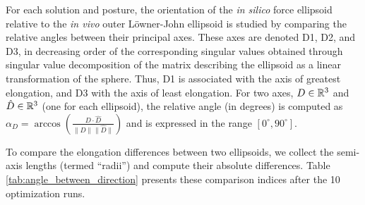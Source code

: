 For each solution and posture, the orientation of the \emph{in silico} force ellipsoid relative to the \emph{in vivo} outer Löwner-John ellipsoid is studied by comparing the relative angles between their principal axes. These axes are denoted D1, D2, and D3, in decreasing order of the corresponding singular values obtained through singular value decomposition of the matrix describing the ellipsoid as a linear transformation of the sphere. Thus, D1 is associated with the axis of greatest elongation, and D3 with the axis of least elongation. For two axes, $D\in\mathbb{R}^3$ and $\hat{D}\in\mathbb{R}^3$ (one for each ellipsoid), the relative angle (in degrees) is computed as $\alpha_D = \arccos\left(\frac{D \cdot \hat{D}}{\|D\|\|\hat{D}\|}\right)$ and is expressed in the range $[0^\circ, 90^\circ]$.

To compare the elongation differences between two ellipsoids, we collect the semi-axis lengths (termed ``radii'') and compute their absolute differences. Table \ref{tab:angle_between_direction} presents these comparison indices after the 10 optimization runs.

